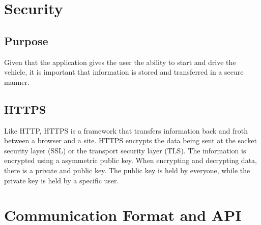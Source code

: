\documentclass[onecolumn, draftclsnofoot,10pt, compsoc]{IEEEtran}
\begin{document}
\section{Security}
    \subsection{Purpose}
    Given that the application gives the user the ability to start and drive the vehicle, it is important that information is stored and transferred in a secure manner.  
    \subsection{HTTPS}
    Like HTTP, HTTPS is a framework that transfers information back and froth between a browser and a site. HTTPS encrypts the data being sent at the socket security layer (SSL) or the transport security layer (TLS). The information is encrypted using a asymmetric public key. When encrypting and decrypting data, there is a private and public key. The public key is held by everyone, while the private key is held by a specific user.\cite{HTTPS} 
\section{Communication Format and API}
\end{document}
